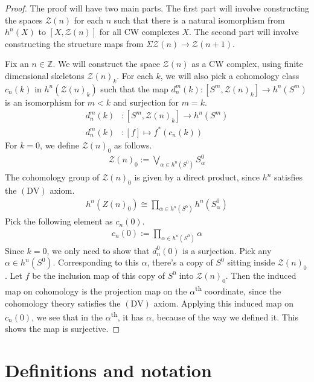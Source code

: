 \documentclass[12pt, notitlepage]{article}
\theoremstyle{definition}
\newcommand{\calz}{\mathcal{Z}}
\begin{document}
\begin{proof}
  The proof will have two main parts. The first part will involve constructing the spaces $\calz(n)$
  for each $n$ such that there is a natural isomorphism from $h^n(X)$ to $\left[ X, \calz(n) \right]$
  for all CW complexes $X$. The second part will involve constructing the structure maps from
  $\Sigma \calz(n) \to \calz(n+1)$.

  Fix an $n \in \mathbb{Z}$. We will construct the space $\calz(n)$ as a CW complex, using finite
  dimensional skeletons $\calz(n)_k$. For each $k$, we will also pick a cohomology class $c_n(k)$ in
  $h^n(\calz(n)_k)$ such that the map $d_n^{m}(k): \left[S^m, \calz(n)_k \right] \to h^n(S^m)$ is an
  isomorphism for $m < k$ and surjection for $m=k$.
  \begin{align*}
    d_n^{m}(k) &: \left[ S^m, \calz(n)_k\right] \to h^n(S^m) \\
    d_n^{m}(k) &: [f] \mapsto f^{\ast}(c_n(k))
  \end{align*}
  For $k=0$, we define $\calz(n)_0$ as follows.
  \begin{align*}
    \calz(n)_0 := \bigvee_{\alpha \in h^n(S^0)} S_{\alpha}^0
  \end{align*}
  The cohomology group of $\calz(n)_0$ is given by a direct product, since $h^n$ satisfies the $\mathrm{(DV)}$
  axiom.
  \begin{align*}
    h^n(Z(n)_0) \cong \prod_{\alpha \in h^n(S^0)} h^n(S_{\alpha}^0)
  \end{align*}
  Pick the following element as $c_n(0)$.
  \begin{align*}
    c_n(0) := \prod_{\alpha \in h^n(S^0)} \alpha
  \end{align*}
  Since $k=0$, we only need to show that $d_n^0(0)$ is a surjection. Pick any $\alpha \in h^n(S^0)$.
  Corresponding to this $\alpha$, there's a copy of $S^0$ sitting inside $\calz(n)_0$. Let $f$ be the
  inclusion map of this copy of $S^0$ into $\calz(n)_0$. Then the induced map on cohomology is the projection
  map on the $\alpha$\textsuperscript{th} coordinate, since the cohomology theory satisfies the $(\mathrm{DV})$ axiom. Applying this induced
  map on $c_n(0)$, we see that in the $\alpha$\textsuperscript{th}, it has $\alpha$, because of the way we defined it.
  This shows the map is surjective.
\end{proof}

\newpage

\appendix

\section{Definitions and notation}
\label{sec:definitions-notation}
\end{document}
